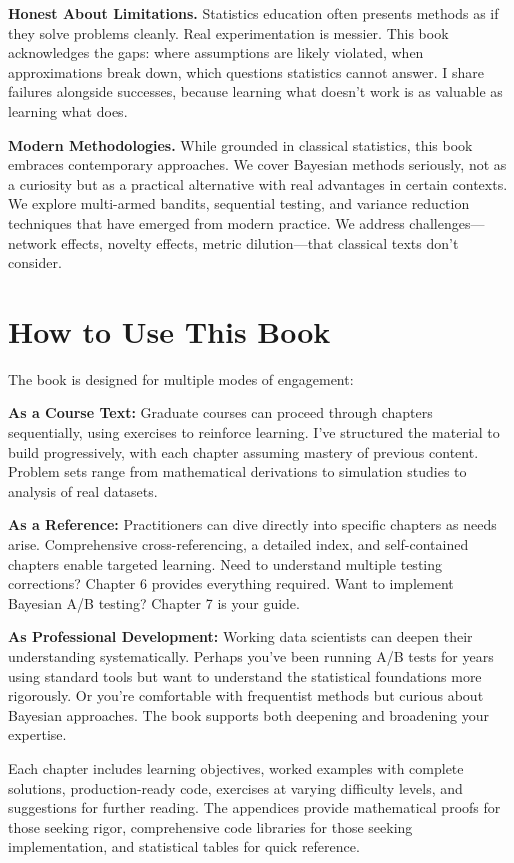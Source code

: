 \textbf{Honest About Limitations.} Statistics education often presents methods as if they solve problems cleanly. Real experimentation is messier. This book acknowledges the gaps: where assumptions are likely violated, when approximations break down, which questions statistics cannot answer. I share failures alongside successes, because learning what doesn't work is as valuable as learning what does.

\textbf{Modern Methodologies.} While grounded in classical statistics, this book embraces contemporary approaches. We cover Bayesian methods seriously, not as a curiosity but as a practical alternative with real advantages in certain contexts. We explore multi-armed bandits, sequential testing, and variance reduction techniques that have emerged from modern practice. We address challenges—network effects, novelty effects, metric dilution—that classical texts don't consider.

\section*{How to Use This Book}

The book is designed for multiple modes of engagement:

\textbf{As a Course Text:} Graduate courses can proceed through chapters sequentially, using exercises to reinforce learning. I've structured the material to build progressively, with each chapter assuming mastery of previous content. Problem sets range from mathematical derivations to simulation studies to analysis of real datasets.

\textbf{As a Reference:} Practitioners can dive directly into specific chapters as needs arise. Comprehensive cross-referencing, a detailed index, and self-contained chapters enable targeted learning. Need to understand multiple testing corrections? Chapter 6 provides everything required. Want to implement Bayesian A/B testing? Chapter 7 is your guide.

\textbf{As Professional Development:} Working data scientists can deepen their understanding systematically. Perhaps you've been running A/B tests for years using standard tools but want to understand the statistical foundations more rigorously. Or you're comfortable with frequentist methods but curious about Bayesian approaches. The book supports both deepening and broadening your expertise.

Each chapter includes learning objectives, worked examples with complete solutions, production-ready code, exercises at varying difficulty levels, and suggestions for further reading. The appendices provide mathematical proofs for those seeking rigor, comprehensive code libraries for those seeking implementation, and statistical tables for quick reference.

